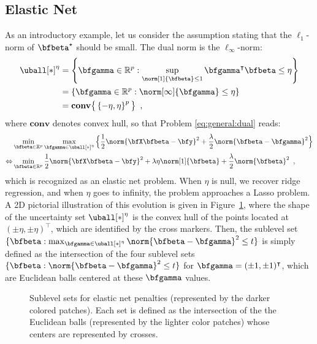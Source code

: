 \subsection{Elastic Net} \label{sec:elasticnet}

As an introductory example, let us consider the assumption stating that the
$\ell_1$-norm of $\bfbeta^\star$ should be small. 
The dual norm is the $\ell_\infty$-norm:
%
\begin{align*}
  \uball[*]^\eta & = \left\{ \bfgamma \in \mathbb{R}^p :
\sup_{\norm[1]{\bfbeta}\leq1} \bfgamma^\intercal\bfbeta \leq \eta \right\} \\
    & = \left\{ \bfgamma \in \mathbb{R}^p : \norm[\infty]{\bfgamma} \leq \eta \right\} \\
    & = \mathbf{conv} \big\{ \left\{ -\eta, \eta \right\}^p \big\}
  \enspace,
\end{align*}
where $\mathbf{conv}$ denotes convex hull, so that Problem
\eqref{eq:general:dual} reads:
%
\begin{align}
  & \min_{\bfbeta\in\mathbb{R}^p} \max_{\bfgamma \in\uball[*]^\eta}
      \Big\{ \frac{1}{2} \norm{\bfX \bfbeta - \bfy}^2 + \frac{\lambda}{2} \norm{\bfbeta - \bfgamma}^2 
      \Big\} \nonumber \\
  \Leftrightarrow
    & \min_{\bfbeta\in\mathbb{R}^p}
       \frac{1}{2} \norm{\bfX \bfbeta - \bfy}^2 + \lambda \eta
       \norm[1]{\bfbeta} + \frac{\lambda}{2} \norm{\bfbeta}^2
  \enspace, \label{eq:elastic-net}
\end{align}
%
which is recognized as an elastic net problem.
When $\eta$ is null, we recover ridge regression, and when $\eta$ goes to 
infinity, the problem approaches a Lasso problem.
A 2D pictorial illustration of this evolution is given in
Figure~\ref{fig:en-penalty}, where the shape of the uncertainty set
$\uball[*]^\eta$ is the convex hull of the points located at 
$(\pm \eta, \pm \eta)^\intercal$, which are identified by the cross markers.
Then, the sublevel set 
$\{\bfbeta : \max_{\bfgamma \in \uball[*]^\eta} \norm{\bfbeta-\bfgamma}^2 \leq t\}$
is simply defined as the intersection of the four sublevel sets
$\{\bfbeta : \norm{\bfbeta - \bfgamma}^2 \leq t\}$ for $\bfgamma=(\pm
1, \pm 1)^\intercal$, which are Euclidean balls centered at
these $\bfgamma$ values.
%
\begin{figure}
  \begin{center} 
    \caption{Sublevel sets for elastic net penalties (represented by the darker
             colored patches).  
             Each set is defined as the intersection of the the Euclidean balls
             (represented by the lighter color patches) whose centers are
             represented by crosses.}
    \label{fig:en-penalty}
    \end{center} 
\end{figure}

